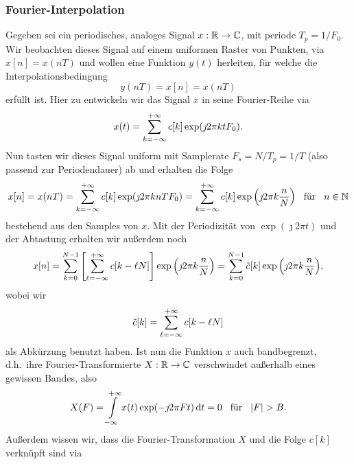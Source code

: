 \subsubsection{Fourier-Interpolation}
%
%
Gegeben sei ein periodisches, analoges Signal $x: \mathbb{R} \rightarrow \mathbb{C}$, mit periode $T_p = 1/F_0$. Wir beobachten dieses Signal auf einem uniformen Raster von Punkten, via $x[n] = x(n T)$ und wollen eine Funktion $y(t)$ herleiten, f\"ur welche die Interpolationsbedingung
\begin{equation}\label{eadf_interpol_cond}
    y(nT) = x[n] = x(nT)
\end{equation}
erf\"ullt ist. Hier zu entwickeln wir das Signal $x$ in seine Fourier-Reihe via
\begin{equation}\label{fourier_series}
    x(t) = {\sum\limits_{k=-\infty}^{+\infty}{
        c[k] \exp(\jmath 2 \pi k t F_0) 
    }}.
\end{equation}
Nun tasten wir dieses Signal uniform mit Samplerate $F_s = N/T_p = 1/T$ (also passend zur Periodendauer) ab und erhalten die Folge 
\begin{equation}
    x[n] = x(n T) = {\sum\limits_{k=-\infty}^{+\infty}{
        c[k] \exp(\jmath 2 \pi k n T F_0) 
    }} = {\sum\limits_{k=-\infty}^{+\infty}{
        c[k] \exp\left(\jmath 2 \pi k \frac nN\right) 
    }}
    {\hspace{3mm} \text{f\"ur} \hspace{3mm}}
    n \in \mathbb{N}
\end{equation}
bestehend aus den Samples von $x$. Mit der Periodizit\"at von $\exp(\jmath 2 \pi t)$ und der Abtastung erhalten wir au{\ss}erdem noch
\begin{equation}
    x[n] = {\sum\limits_{k=0}^{N-1}{
        \left[{\sum\limits_{\ell=-\infty}^{+\infty}{
            c[k - \ell N]
        }}\right] \exp\left(\jmath 2 \pi k \frac nN\right) 
    }} = {\sum\limits_{k=0}^{N-1}{
        \tilde{c}[k] \exp\left(\jmath 2 \pi k \frac nN\right) 
    }},
\end{equation}
wobei wir 
\begin{equation}\label{aliased_ck}
    \tilde{c}[k] = {\sum\limits_{\ell=-\infty}^{+\infty}{
        c[k - \ell N]
    }}
\end{equation}
als Abk\"urzung benutzt haben. Ist nun die Funktion $x$ auch bandbegrenzt, d.h.~ihre Fourier-Transformierte $X : \mathbb{R} \rightarrow \mathbb{C}$ verschwindet au{\ss}erhalb eines gewissen Bandes, also
\begin{equation}
    X(F) = {\int\limits_{-\infty}^{+\infty}{x(t) \exp(-\jmath 2 \pi F t )}\,\mathrm{d}{t}} = 0 {\hspace{3mm} \text{f\"ur} \hspace{3mm}} {\left| F \right|} > B.
\end{equation}
Au{\ss}erdem wissen wir, dass die Fourier-Transformation $X$ und die Folge $c[k]$ verkn\"upft sind via 
